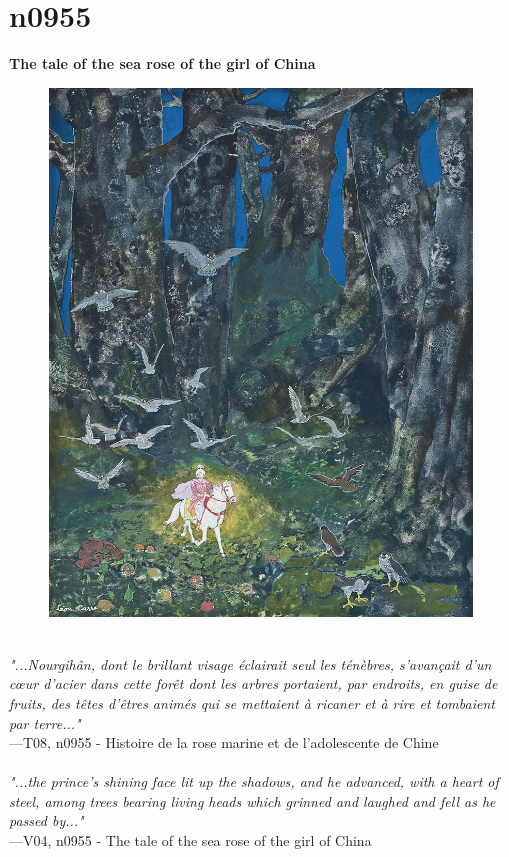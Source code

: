 \documentclass[../Carre_nights.tex]{subfiles}
\begin{document}
\newpage

\section{n0955}
\textbf{\Large{The tale of the sea rose of the girl of China}} \\

\begin{figure}[ht]
\centering
\includegraphics[height=\figsize]{illustrations/volume_8/T08, n0955 - Histoire de la rose marine et de l'adolescente de Chine.jpg}
\end{figure}

\textit{\\
"...Nourgihân, dont le brillant visage éclairait seul les ténèbres, s’avançait d’un cœur d’acier dans cette forêt dont les arbres portaient, par endroits, en guise de fruits, des têtes d’êtres animés qui se mettaient à ricaner et à rire et tombaient par terre..."} \\
—T08, n0955 - Histoire de la rose marine et de l'adolescente de Chine \\~\\
\textit{"...the prince's shining face lit up the shadows, and he advanced, with a heart of steel, among trees bearing living heads which grinned and laughed and fell as he passed by..."} \\
—V04, n0955 - The tale of the sea rose of the girl of China
\end{document}
